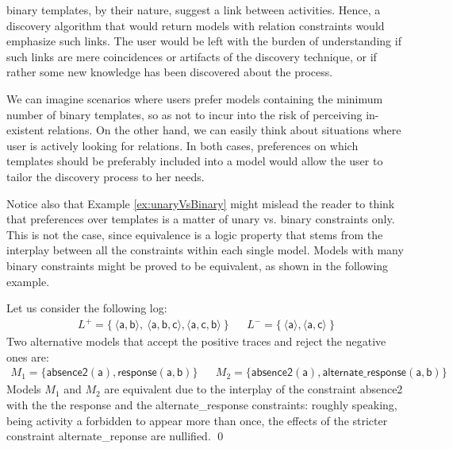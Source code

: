 \declare binary templates, by their nature, suggest a link between activities. Hence, a discovery algorithm that would return models with relation constraints would emphasize such links. The user would be left with the burden of understanding if such links are mere coincidences or artifacts of the discovery technique, or if rather some new knowledge has been discovered about the process.

We can imagine scenarios where  users prefer models containing the minimum number of binary templates, so as not to incur into the risk of perceiving in-existent relations. On the other hand, we can easily think about %
 situations where  user is actively looking for %
 relations. In both cases, preferences on 
 which \declare templates should be preferably included into a model would allow the  user to tailor the discovery process to her needs.

Notice also that Example \ref{ex:unaryVsBinary} might mislead the reader to think that preferences over templates is a matter of unary vs. binary constraints only. This is not the case, since equivalence is a logic property that stems from the interplay between all the constraints within each single model. Models with many binary constraints might be proved to be equivalent, as shown in the following example.

\begin{example}
\label{ex:alternateVsResponseEquiv}
Let us consider the following log:
\begin{align*}
L^+ = \{\ \langle \mathsf{a}, \mathsf{b} \rangle,\ \langle \mathsf{a}, \mathsf{b}, \mathsf{c} \rangle, \langle \mathsf{a}, \mathsf{c}, \mathsf{b} \rangle\ \} &&
L^- = \{\ \langle \mathsf{a} \rangle, \langle \mathsf{a}, \mathsf{c} \rangle \ \}
\end{align*}
%
Two alternative models that accept the positive traces and reject the negative ones are:
{\small{\begin{align*}
M_1  = \{ \mathsf{absence2(a),response(a,b)}\} &&
M_2  = \{ \mathsf{absence2(a),alternate\_response(a, b)}\}
\end{align*}
}}
Models $M_1$ and $M_2$  %
are equivalent due to the interplay of the constraint \textsf{absence2} with the the \textsf{response} and the \textsf{alternate\_response} constraints: roughly speaking, being activity \textsf{a} forbidden to appear more than once, the effects of the stricter constraint \textsf{alternate\_reponse} are nullified.
\qed
\end{example}



